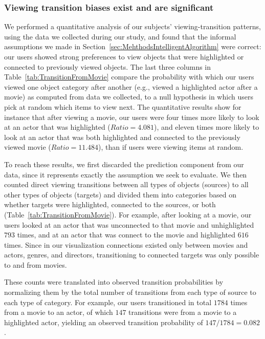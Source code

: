 \subsubsection{Viewing transition biases exist and are significant}
\label{sec:EvalAssumptionAboutViewingTransition}
We performed a quantitative analysis of our subjects' viewing-transition patterns, using the data we collected during our study, and found that the informal assumptions we made in Section~\ref{sec:MehthodsIntelligentAlgorithm} were correct: our users showed strong preferences to view objects that were highlighted or connected to previously viewed objects. The last three columns in Table~\ref{tab:TransitionFromMovie} compare the probability with which our users viewed one object category after another (e.g., viewed a highlighted actor after a movie) as computed from data we collected, to a null hypothesis in which users pick at random which items to view next. The quantitative results show for instance that after viewing a movie, our users were four times more likely to look at an actor that was highlighted ($Ratio = 4.081$), and eleven times more likely to look at an actor that was both highlighted and connected to the previously viewed movie ($Ratio = 11.484$), than if users were viewing items at random.  


To reach these results, we first discarded the prediction component from our data, since it represents exactly the assumption we seek to evaluate. We then counted direct viewing transitions between all types of objects (sources) to all other types of objects (targets) and divided them into categories based on whether targets were highlighted, connected to the sources, or both (Table~\ref{tab:TransitionFromMovie}).  For example, after looking at a movie, our users looked at an actor that was unconnected to that movie and unhighlighted $793$ times, and at an actor that was connect to the movie and highlighted $616$ times. Since in our visualization connections existed only between movies and actors, genres, and directors, transitioning to connected targets was only possible to and from movies.
    

These counts were translated into observed transition probabilities by normalizing them by the total number of transitions from each type of source to each type of category. For example, our users transitioned in total $1784$ times from a movie to an actor, of which $147$ transitions were from a movie to a highlighted actor, yielding an observed transition probability of $147 / 1784 = 0.082$.

